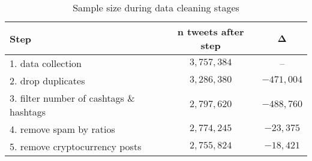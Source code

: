 \begin{table}[!ht]
	\centering
	\begin{tabular}{lcc}
		\toprule
		\textbf{Step} & \textbf{$\bm{n}$ tweets after step} & $\bm{\Delta}$ \\
		\midrule
		1. data collection & $3,757,384$ & -- \\
		2. drop duplicates & $3,286,380$ & $-471,004$ \\
		3. filter number of cashtags \& hashtags & $2,797,620$ & $-488,760$ \\
		4. remove spam by ratios & $2,774,245$ & $-23,375$ \\
		5. remove cryptocurrency posts & $2,755,824$ & $-18,421$\\
		\bottomrule
	\end{tabular}
	\caption{Sample size during data cleaning stages}
	\label{table-samplesize-datacleaning}
\end{table}